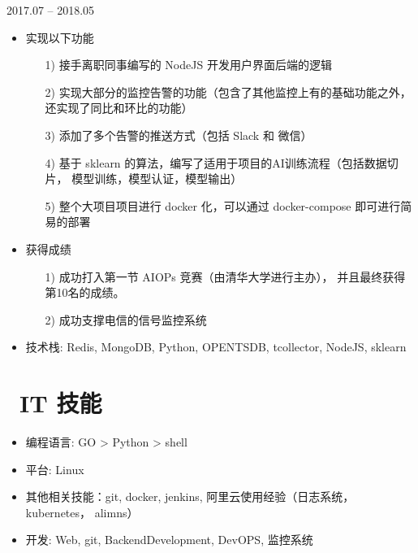 \documentclass{resume}
\begin{document}
 {2017.07 -- 2018.05}
\newline
{}
\begin{onehalfspacing}
\begin{itemize}
  \item 实现以下功能
  \begin{itemize}
    \item [1)]
     接手离职同事编写的 NodeJS 开发用户界面后端的逻辑
    \item [2)]
      实现大部分的监控告警的功能（包含了其他监控上有的基础功能之外，还实现了同比和环比的功能）
    \item [3)]
      添加了多个告警的推送方式（包括 Slack 和 微信）
    \item [4)]
      基于 sklearn 的算法，编写了适用于项目的AI训练流程（包括数据切片， 模型训练，模型认证，模型输出）
    \item [5)]
      整个大项目项目进行 docker 化，可以通过 docker-compose 即可进行简易的部署 
  \end{itemize}
  \item 获得成绩
  \begin{itemize}
    \item [1)]成功打入第一节 AIOPs 竞赛（由清华大学进行主办）， 并且最终获得第10名的成绩。
    \item [2)]成功支撑电信的信号监控系统
  \end{itemize}
  \item 技术栈: Redis, MongoDB, Python, OPENTSDB, tcollector, NodeJS, sklearn
\end{itemize}
\end{onehalfspacing}


\section{\faCogs\ IT 技能}
\begin{itemize}[parsep=0.5ex]
  \item 编程语言: GO > Python > shell 
  \item 平台: Linux
  \item 其他相关技能：git, docker, jenkins, 阿里云使用经验（日志系统，kubernetes， alimns）
  \item 开发: Web, git, BackendDevelopment, DevOPS, 监控系统
\end{itemize}
\end{document}
